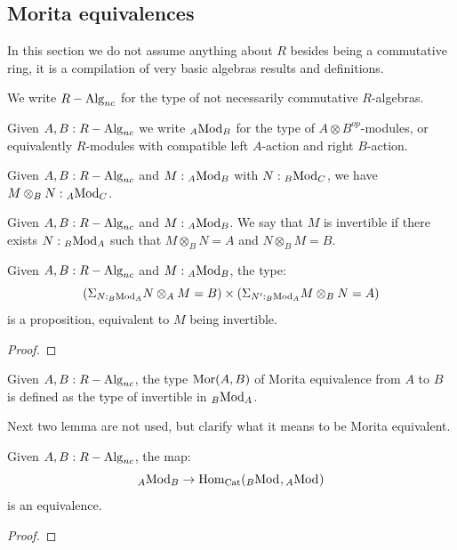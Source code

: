 \subsection{Morita equivalences}

In this section we do not assume anything about $R$ besides being a commutative ring, it is a compilation of very basic algebras results and definitions.

We write $R-{\mathrm{Alg}}_{nc}$ for the type of not necessarily commutative $R$-algebras.

Given  $A,B:R-{\mathrm{Alg}}_{nc}$ we write ${}_{A}{\mathrm{Mod}}_{B}$ for the type of $A\otimes B^{op}$-modules, or equivalently $R$-modules with compatible left $A$-action and right $B$-action.

Given $A,B:R-{\mathrm{Alg}}_{nc}$ and $M:{}_{A}{\mathrm{Mod}}_{B}$ with $N:{}_{B}{\mathrm{Mod}}_{C}$, we have $M\otimes_BN:{}_{A}{\mathrm{Mod}}_{C}$.

\begin{definition}
Given $A,B:R-{\mathrm{Alg}}_{nc}$ and $M:{}_{A}{\mathrm{Mod}}_{B}$. We say that $M$ is invertible if there exists $N:{}_{B}{\mathrm{Mod}}_{A}$ such that $M\otimes_B N = A$ and $N\otimes_B M = B$.
\end{definition}

\begin{lemma}
Given $A,B:R-{\mathrm{Alg}}_{nc}$ and $M:{}_{A}{\mathrm{Mod}}_{B}$, the type:
\[ (\Sigma_{N:{}_{B}{\mathrm{Mod}}_{A}}N\otimes_AM=B) \times (\Sigma_{N':{}_{B}{\mathrm{Mod}}_{A}} M\otimes_BN = A)\]
is a proposition, equivalent to $M$ being invertible.
\end{lemma}

\begin{proof}
\end{proof}

\begin{definition}
Given $A,B:R-{\mathrm{Alg}}_{nc}$, the type ${\mathrm{Mor}}(A,B)$ of Morita equivalence from $A$ to $B$ is defined as the type of invertible in ${}_{B}{\mathrm{Mod}}_{A}$.
\end{definition}

Next two lemma are not used, but clarify what it means to be Morita equivalent.

\begin{lemma}
Given $A,B:R-{\mathrm{Alg}}_{nc}$, the map:
\[{}_{A}{\mathrm{Mod}}_{B} \to \mathrm{Hom}_{{\mathrm{Cat}}}({}_{B}{\mathrm{Mod}}_{},{}_{A}{\mathrm{Mod}}_{})\]
is an equivalence.
\end{lemma}

\begin{proof}
\end{proof}

